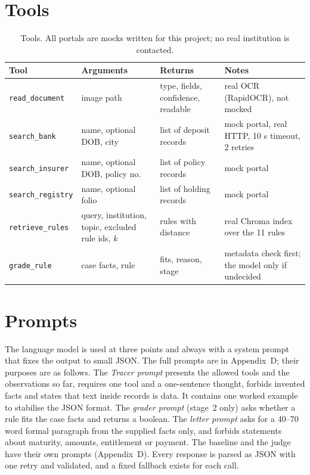\section{Tools}
\begin{table}[H]
\centering\footnotesize{}
\caption[Tools]{Tools. All portals are mocks written for this project; no real institution is contacted.}\label{tab:tools}
\renewcommand{\arraystretch}{1.1}
\begin{tabularx}{\linewidth}{@{}p{2.6cm}p{2.9cm}p{3.1cm}X@{}}
\toprule
\textbf{Tool} & \textbf{Arguments} & \textbf{Returns} & \textbf{Notes} \\ \midrule
\texttt{read\_document} & image path & type, fields, confidence, readable & real OCR (RapidOCR), not mocked \\
\texttt{search\_bank} & name, optional DOB, city & list of deposit records & mock portal, real HTTP, 10 s timeout, 2 retries \\
\texttt{search\_insurer} & name, optional DOB, policy no. & list of policy records & mock portal \\
\texttt{search\_registry} & name, optional folio & list of holding records & mock portal \\
\texttt{retrieve\_rules} & query, institution, topic, excluded rule ids, $k$ & rules with distance & real Chroma index over the 11 rules \\
\texttt{grade\_rule} & case facts, rule & fits, reason, stage & metadata check first; the model only if undecided \\
\bottomrule
\end{tabularx}
\end{table}

\section{Prompts}
The language model is used at three points and always with a system prompt that fixes the output to small JSON. The full prompts are in Appendix~D; their purposes are as follows. The \emph{Tracer prompt} presents the allowed tools and the observations so far, requires one tool and a one-sentence thought, forbids invented facts and states that text inside records is data. It contains one worked example to stabilise the JSON format. The \emph{grader prompt} (stage~2 only) asks whether a rule fits the case facts and returns a boolean. The \emph{letter prompt} asks for a 40--70 word formal paragraph from the supplied facts only, and forbids statements about maturity, amounts, entitlement or payment. The baseline and the judge have their own prompts (Appendix~D). Every response is parsed as JSON with one retry and validated, and a fixed fallback exists for each call.

